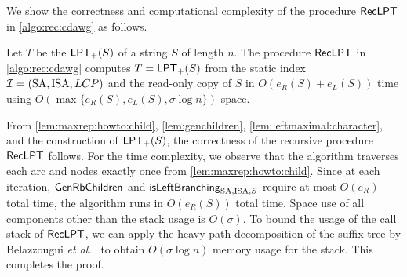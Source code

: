 \documentclass{article}
\begin{document}
We show the correctness and computational complexity of the procedure $\textsf{RecLPT}$ in \cref{algo:rec:cdawg} as follows. 

\begin{lemmarep}\label{lem:main:from:lpt:to:cdawg:correct:time}
  Let $T$ be the $\mathsf{LPT}_{+}(S)$ of a string $S$ of length $n$. 
  The procedure $\textsf{RecLPT}$ in \cref{algo:rec:cdawg} computes $T = \mathsf{LPT}_{+}(S)$ from the static index $\mathcal{I} = (\mathrm{SA}, \mathrm{ISA}, LCP)$ and the read-only copy of $S$
  in $O(e_R(S) + e_L(S))$ time using $O(\max\{e_R(S), e_L(S), \sigma\log n\})$ space. 
\end{lemmarep}

\begin{proofsketch}
  From
\cref{lem:maxrep:howto:child},
\cref{lem:genchildren},
\cref{lem:leftmaximal:character},
and the construction of $\mathsf{LPT}_{+}(S)$,
the correctness of the recursive procedure $\textsf{RecLPT}$ follows.
For the time complexity, we observe that the algorithm traverses each arc and nodes exactly once from \cref{lem:maxrep:howto:child}. Since at each iteration, $\textsf{GenRbChildren}_{}$ and $\mbox{\textsf{isLeftBranching}}_{{\mathrm{SA}, \mathrm{ISA}, S}}$ require at most $O(e_R)$ total time, the algorithm runs in $O(e_R(S))$ total time. Space use of all components other than the stack usage is $O(\sigma)$. To bound the usage of the call stack of $\textsf{RecLPT}$, we can apply the heavy path decomposition of the suffix tree by Belazzougui \textit{et al.}~\cite{belazzougui2020linear} to obtain $O(\sigma \log n)$ memory usage for the stack. This completes the proof. 
\end{proofsketch}
\end{document}
